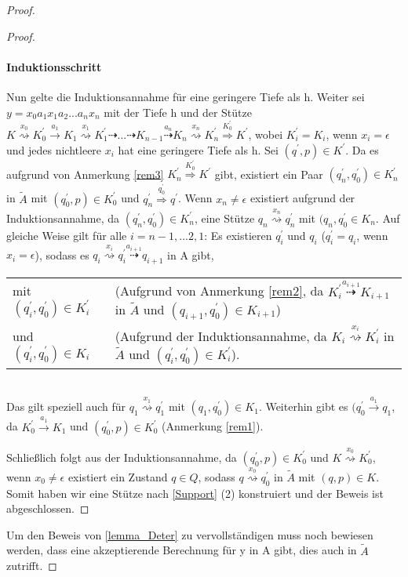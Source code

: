 \begin{proof}
\begin{proof}
\paragraph*{Induktionsschritt} 
Nun gelte die Induktionsannahme für eine geringere Tiefe als h. Weiter sei $y=x_0a_1x_1a_2...a_nx_n$ mit der Tiefe h und der Stütze $K \stackrel{x_0}{\rightsquigarrow} K_0^{\prime} \stackrel{a_1}{\rightarrow} K_1\stackrel{x_1}{\rightsquigarrow} K_1^{\prime} \dashrightarrow ... \dashrightarrow K_{n-1} \stackrel{a_n}{\dashrightarrow} K_n \stackrel{x_n}{\rightsquigarrow} K_n^\prime \stackrel{K_0^{\prime}} {\Rightarrow} K^\prime$, wobei $K_i^\prime = K_i$, wenn $x_i= \epsilon$ und jedes nichtleere $x_i$ hat eine geringere Tiefe als h. Sei $(q^\prime, p) \in K^\prime$. Da es aufgrund von Anmerkung \ref{rem3} $K_n^\prime \stackrel{K_0^\prime} {\Rightarrow} K^\prime$ gibt, existiert ein Paar $(q_n^\prime, q_0^\prime) \in K_n^\prime$ in $\tilde{A}$ mit $(q_0^\prime, p) \in K_0^\prime$ und $q_n^\prime \stackrel{q_0^\prime}{\Rightarrow} q^\prime$. Wenn $x_n \neq \epsilon$ existiert aufgrund der Induktionsannahme, da $(q_n^\prime, q_0^\prime) \in K_n^\prime$, eine Stütze $q_n \stackrel{x_n}{\rightsquigarrow} q_n^\prime$ mit $(q_n, q_0^\prime \in K_n$. Auf gleiche Weise gilt für alle $i=n-1,...2,1$: Es existieren $q_i^\prime$ und $q_i$ ($q_i^\prime=q_i$, wenn $x_i= \epsilon$), sodass es $q_i \stackrel{x_i}{\rightsquigarrow} q_i^\prime \stackrel{a_{i+1}}{\dashrightarrow}q_{i+1}$ in A gibt,

\begin{tabular}{l p{8cm}}
mit $(q_i^\prime, q_0^\prime) \in K_i^\prime$ & (Aufgrund von Anmerkung \ref{rem2}, da $K_i^\prime \stackrel{a_{i+1}}{\dashrightarrow} K_{i+1}$ in $\tilde{A}$ und $(q_{i+1}, q_0^\prime) \in K_{i+1}$)\\

 und $(q_i^\prime, q_0^\prime) \in K_i$ & (Aufgrund der Induktionsannahme, da $K_i \stackrel{x_i}{\rightsquigarrow} K_i^\prime$ in $\tilde{A}$ und $(q_i^\prime, q_0^\prime) \in K_i^\prime$).
  \end{tabular}\\
 Das gilt speziell auch für $q_1 \stackrel{x_1}{\rightsquigarrow}q_1^\prime$ mit $(q_1, q_0^\prime) \in K_1$. Weiterhin gibt es $(q_0^\prime \stackrel{a_1}{\rightarrow} q_1$, da $K_0^\prime \stackrel{a_1} {\rightarrow} K_1$ und $(q_0^\prime, p) \in K_0^\prime$ (Anmerkung \ref{rem1}).
 
 Schließlich folgt aus der Induktionsannahme, da $(q_0^\prime, p) \in K_0^\prime$ und $K\stackrel{x_0}{\rightsquigarrow} K_0^\prime$, wenn $x_0 \neq \epsilon$ existiert ein Zustand $q \in Q$, sodass $q \stackrel{x_0}{\rightsquigarrow} q_0^\prime$ in $\tilde{A}$ mit $(q,p) \in K$. Somit haben wir eine Stütze nach \autoref{Support} (2) konstruiert und der Beweis ist abgeschlossen.
  \end{proof}
Um den Beweis von \autoref{lemma_Deter} zu vervollständigen muss noch bewiesen werden, dass eine akzeptierende Berechnung für y in A gibt, dies auch in $\tilde{A}$ zutrifft. 


\end{proof}
